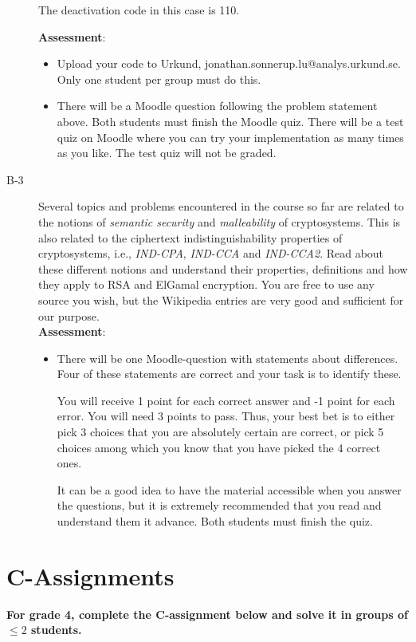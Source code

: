 \documentclass{article}
\begin{document}
\begin{description}
{			The deactivation code in this case is 110.
			
			\textbf{Assessment}:
			\begin{itemize}
				\item Upload your code to Urkund, jonathan.sonnerup.lu@analys.urkund.se. Only one student per group must do this.
				\item There will be a Moodle question following the problem statement above. Both students must finish the Moodle quiz. There will be	a test quiz on Moodle where you can try your implementation as many times as you like. The test quiz will not be graded.
			\end{itemize}}
			
			\item[B-3]{Several topics and problems encountered in the course so far are related to the notions of \textit{semantic security} and \textit{malleability} of cryptosystems. This is also related to the ciphertext indistinguishability properties of cryptosystems, i.e., \textit{IND-CPA}, \textit{IND-CCA} and \textit{IND-CCA2}. Read about these different notions and understand their properties, definitions and how they apply to RSA and ElGamal encryption. You are free to use any source you wish, but the Wikipedia entries are very good and sufficient for our purpose.\\
				\textbf{Assessment}:
				\begin{itemize}
					\item There will be one Moodle-question with statements about differences. Four of these statements are correct and your task is to identify these.  
					
					You will receive 1 point for each correct answer and -1 point for each error. You will need 3 points to pass. Thus, your best bet is to either pick 3 choices that you are absolutely certain are correct, or pick 5 choices among which you know that you have picked the 4 correct ones.
					
					It can be a good idea to have the material accessible when you answer the questions, but it is extremely recommended that you read and understand them it advance. Both students must finish the quiz.
				\end{itemize}}
				
				
			\end{description}
			
			\section*{C-Assignments}
			\textbf{For grade 4, complete the C-assignment below and solve it in groups of $\leq 2$ students.}
			
\end{document}
